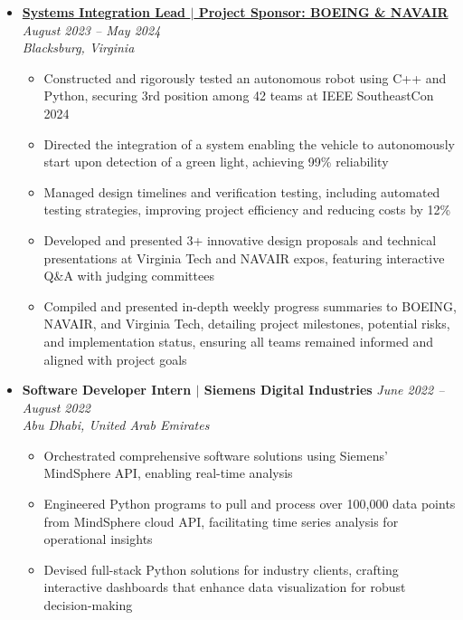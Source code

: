 \documentclass[letterpaper,11pt]{article}
\begin{document}
\begin{itemize}[leftmargin=0mm, label={}, itemsep=1pt]
  \item \textbf{\href{https://www.youtube.com/watch?v=jMc0rQBXLdU}{Systems Integration Lead $|$ Project Sponsor: BOEING \& NAVAIR}} \hfill \textit{\small August 2023 -- May 2024} \\
  \small \textit{Blacksburg, Virginia} \vspace{-0.1\baselineskip}  %
  \begin{itemize}[leftmargin=5mm, itemsep=0pt, topsep=0pt]  %
    \item \small Constructed and rigorously tested an autonomous robot using C++ and Python, securing 3rd position among 42 teams at IEEE SoutheastCon 2024
    \item \small Directed the integration of a system enabling the vehicle to autonomously start upon detection of a green light, achieving 99\% reliability
    \item \small Managed design timelines and verification testing, including automated testing strategies, improving project efficiency and reducing costs by 12\%
    \item \small Developed and presented 3+ innovative design proposals and technical presentations at Virginia Tech and NAVAIR expos, featuring interactive Q\&A with judging committees
    \item \small Compiled and presented in-depth weekly progress summaries to BOEING, NAVAIR, and Virginia Tech, detailing project milestones, potential risks, and implementation status, ensuring all teams remained informed and aligned with project goals
  \end{itemize}

  \item \textbf{Software Developer Intern $|$ Siemens Digital Industries} \hfill \textit{\small June 2022 -- August 2022} \\
  \small \textit{Abu Dhabi, United Arab Emirates} \vspace{-0.15\baselineskip} %
  \begin{itemize}[leftmargin=5mm, itemsep=0pt, topsep=0pt] %
    \item \small Orchestrated comprehensive software solutions using Siemens' MindSphere API, enabling real-time analysis
    \item \small Engineered Python programs to pull and process over 100,000 data points from MindSphere cloud API, facilitating time series analysis for operational insights
    \item \small Devised full-stack Python solutions for industry clients, crafting interactive dashboards that enhance data visualization for robust decision-making
  \end{itemize}


\end{itemize}
\end{document}
